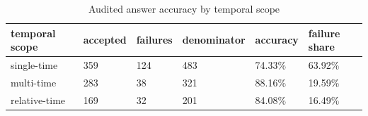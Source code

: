 \begin{table}[htbp]
\centering
\setlength{\tabcolsep}{5pt}
\caption{Audited answer accuracy by temporal scope}
\label{tab:d5c-temporal-scope}
\begin{tabular}{llllll}
\toprule
temporal scope & accepted & failures & denominator & accuracy & failure share \\
\midrule
single-time & 359 & 124 & 483 & 74.33\% & 63.92\% \\
multi-time & 283 & 38 & 321 & 88.16\% & 19.59\% \\
relative-time & 169 & 32 & 201 & 84.08\% & 16.49\% \\
\bottomrule
\end{tabular}
\end{table}
